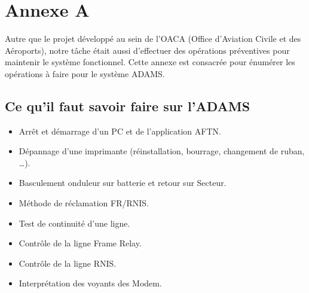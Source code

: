 \chapter*{Annexe A}

\makeatletter
\renewcommand{\thesection}{\@arabic\c@section}
\makeatother

\setcounter{section}{0}

Autre que le projet développé au sein de l’OACA (Office d’Aviation Civile et des Aéroports), notre tâche était aussi d’effectuer des opérations préventives pour maintenir  le système fonctionnel. Cette annexe est consacrée pour énumérer les opérations à faire pour le système ADAMS.
\section*{Ce qu’il faut savoir faire sur l’ADAMS}

\begin{itemize}
\item Arrêt et démarrage d’un PC et de l’application AFTN.\\
\item Dépannage d’une imprimante (réinstallation, bourrage, changement de ruban, …). \\
\item Basculement onduleur sur batterie et retour sur Secteur. \\
\item Méthode de réclamation FR/RNIS. \\
\item Test de continuité d’une ligne. \\
\item Contrôle de la ligne Frame Relay.\\
\item Contrôle de la ligne RNIS. \\
\item Interprétation des voyants  des Modem.\\
\end{itemize}

